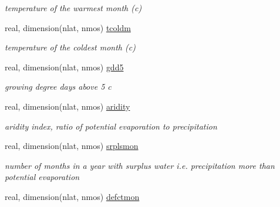 \begin{DoxyCompactItemize}
\begin{DoxyCompactList}\small\item\em temperature of the warmest month (c) \end{DoxyCompactList}\item 
\hypertarget{structctem__statevars_1_1veg__rot_a72ef3fe7dac592152f3546dd0e13b98e}{}real, dimension(nlat, nmos) \hyperlink{structctem__statevars_1_1veg__rot_a72ef3fe7dac592152f3546dd0e13b98e}{tcoldm}\label{structctem__statevars_1_1veg__rot_a72ef3fe7dac592152f3546dd0e13b98e}

\begin{DoxyCompactList}\small\item\em temperature of the coldest month (c) \end{DoxyCompactList}\item 
\hypertarget{structctem__statevars_1_1veg__rot_a8f2cb41a132e5ed3cafcc50aa32f1f8a}{}real, dimension(nlat, nmos) \hyperlink{structctem__statevars_1_1veg__rot_a8f2cb41a132e5ed3cafcc50aa32f1f8a}{gdd5}\label{structctem__statevars_1_1veg__rot_a8f2cb41a132e5ed3cafcc50aa32f1f8a}

\begin{DoxyCompactList}\small\item\em growing degree days above 5 c \end{DoxyCompactList}\item 
\hypertarget{structctem__statevars_1_1veg__rot_a5e65e82e9dcf6376728626ec8816d7f0}{}real, dimension(nlat, nmos) \hyperlink{structctem__statevars_1_1veg__rot_a5e65e82e9dcf6376728626ec8816d7f0}{aridity}\label{structctem__statevars_1_1veg__rot_a5e65e82e9dcf6376728626ec8816d7f0}

\begin{DoxyCompactList}\small\item\em aridity index, ratio of potential evaporation to precipitation \end{DoxyCompactList}\item 
\hypertarget{structctem__statevars_1_1veg__rot_a7e47bb1275883daf396f8895544df1c1}{}real, dimension(nlat, nmos) \hyperlink{structctem__statevars_1_1veg__rot_a7e47bb1275883daf396f8895544df1c1}{srplsmon}\label{structctem__statevars_1_1veg__rot_a7e47bb1275883daf396f8895544df1c1}

\begin{DoxyCompactList}\small\item\em number of months in a year with surplus water i.\+e. precipitation more than potential evaporation \end{DoxyCompactList}\item 
\hypertarget{structctem__statevars_1_1veg__rot_ab9bc71b3863d6336736fd28e18caed2b}{}real, dimension(nlat, nmos) \hyperlink{structctem__statevars_1_1veg__rot_ab9bc71b3863d6336736fd28e18caed2b}{defctmon}\label{structctem__statevars_1_1veg__rot_ab9bc71b3863d6336736fd28e18caed2b}


\end{DoxyCompactItemize}
